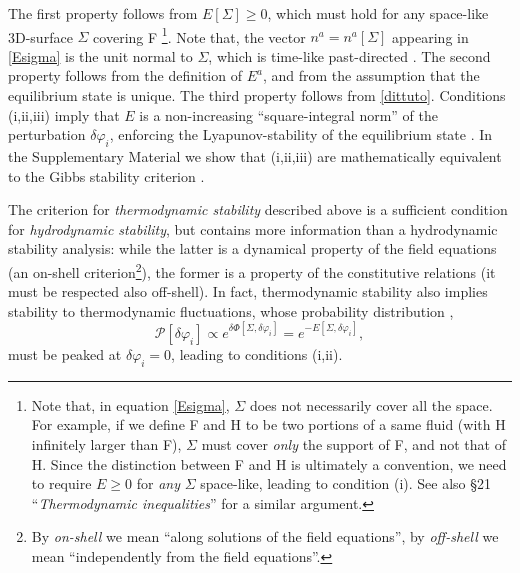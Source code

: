 \documentclass[aps,prl,reprint,nofootinbib]{revtex4-1}
\begin{document}
The first property follows from $E[\Sigma]\geq 0$, which must hold for any space-like 3D-surface $\Sigma$ covering F \footnote{Note that, in equation \eqref{Esigma}, $\Sigma$ does not necessarily cover all the space. For example, if we define F and H to be two portions of a same fluid (with H infinitely larger than F), $\Sigma$ must cover \textit{only} the support of F, and not that of H. Since the distinction between F and H is ultimately a convention, we need to require $E \geq 0$ for \textit{any} $\Sigma$ space-like, leading to condition (i). See also \cite{landau5} \S 21 ``\textit{Thermodynamic inequalities}'' for a similar argument.}. Note that, the vector $n^a=n^a[\Sigma]$ appearing in \eqref{Esigma} is the unit normal to $\Sigma$, which is time-like past-directed \cite{MTW_book}. The second property follows from the definition of $E^a$, and from the assumption that the equilibrium state is unique. The third property follows from \eqref{dittuto}. Conditions (i,ii,iii) imply that $E$ is a non-increasing ``square-integral norm'' of the perturbation $\delta \varphi_i$, enforcing the Lyapunov-stability of the equilibrium state \cite{lasalle1961stability,Prigogine1978,GavassinoLyapunov_2020}. In the Supplementary Material we show that (i,ii,iii) are mathematically equivalent to the Gibbs stability criterion \cite{GavassinoGibbs2021}. 

The criterion for \textit{thermodynamic stability} described above is a sufficient condition for \textit{hydrodynamic stability}, but contains more information than a hydrodynamic stability analysis: while the latter is a dynamical property of the field equations (an on-shell criterion\footnote{By \textit{on-shell}  we mean ``along solutions of the field equations'', by \textit{off-shell} we mean ``independently from the field equations''.}), the former is a property of the constitutive relations (it must be respected also off-shell). In fact, thermodynamic stability also implies stability to thermodynamic fluctuations, whose probability distribution \cite{landau5,Pathria2011},
\begin{equation}
\mathcal{P}[\delta \varphi_i] \propto e^{\delta \Phi[\Sigma,\delta \varphi_i]} = e^{-E[\Sigma,\delta \varphi_i]}, 
\end{equation}
must be peaked at $\delta \varphi_i=0$, leading to conditions (i,ii).
\end{document}
